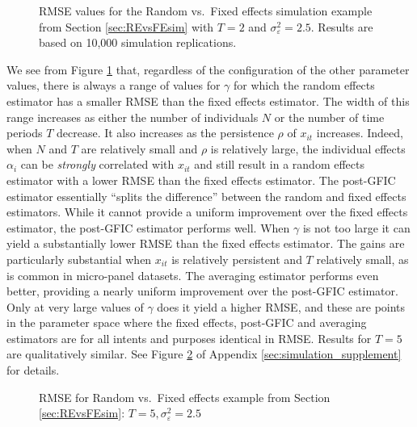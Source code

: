 \begin{figure}[htbp]
  \centering
  
  \caption{RMSE values for the Random vs.\ Fixed effects simulation example from Section \ref{sec:REvsFEsim} with $T=2$ and  $\sigma_{\varepsilon}^2 = 2.5$. Results are based on 10,000 simulation replications.}
  \label{fig:REvsFE_T2}
\end{figure}

We see from Figure \ref{fig:REvsFE_T2} that, regardless of the configuration of the other parameter values, there is always a range of values for $\gamma$ for which the random effects estimator has a smaller RMSE than the fixed effects estimator.
The width of this range increases as either the number of individuals $N$ or the number of time periods $T$ decrease.
It also increases as the persistence $\rho$ of $x_{it}$ increases.
Indeed, when $N$ and $T$ are relatively small and $\rho$ is relatively large, the individual effects $\alpha_{i}$ can be \emph{strongly} correlated with $x_{it}$ and still result in a random effects estimator with a lower RMSE than the fixed effects estimator. 
The post-GFIC estimator essentially ``splits the difference'' between the random and fixed effects estimators.
While it cannot provide a uniform improvement over the fixed effects estimator, the post-GFIC estimator performs well.
When $\gamma$ is not too large it can yield a substantially lower RMSE than the fixed effects estimator.
The gains are particularly substantial when $x_{it}$ is relatively persistent and $T$ relatively small, as is common in micro-panel datasets.
The averaging estimator performs even better, providing a nearly uniform improvement over the post-GFIC estimator.
Only at very large values of $\gamma$ does it yield a higher RMSE, and these are points in the parameter space where the fixed effects, post-GFIC and averaging estimators are for all intents and purposes identical in RMSE.
Results for $T=5$ are qualitatively similar.
See Figure \ref{fig:REvsFE_T5} of Appendix \ref{sec:simulation_supplement} for details.

\begin{figure}[H]
  \centering
  
  \caption{RMSE for Random vs.\ Fixed effects example from Section \ref{sec:REvsFEsim}: $T=5, \sigma_{\varepsilon}^2 = 2.5$}
  \label{fig:REvsFE_T5}
\end{figure}

